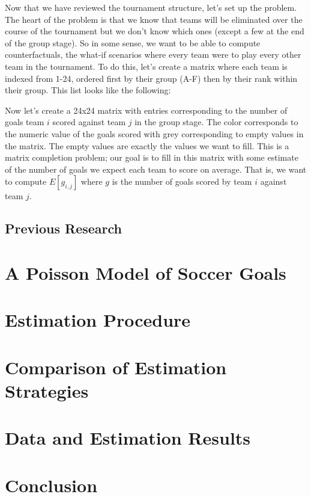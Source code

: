 \documentclass{article}
\begin{document}
Now that we have reviewed the tournament structure, let's set up the problem. The heart of the problem is that we know that teams will be eliminated over the course of the tournament but we don't know which ones (except a few at the end of the group stage). So in some sense, we want to be able to compute counterfactuals, the what-if scenarios where every team were to play every other team in the tournament. To do this, let's create a matrix where each team is indexed from 1-24, ordered first by their group (A-F) then by their rank within their group. This list looks like the following:

Now let's create a 24x24 matrix with entries corresponding to the number of goals team $i$ scored against team $j$ in the group stage. The color corresponds to the numeric value of the goals scored with grey corresponding to empty values in the matrix. The empty values are exactly the values we want to fill. This is a matrix completion problem; our goal is to fill in this matrix with some estimate of the number of goals we expect each team to score on average. That is, we want to compute $E[g_{i,j}]$ where $g$ is the number of goals scored by team $i$ against team $j$.

\subsection{Previous Research}

\section{A Poisson Model of Soccer Goals}

\section{Estimation Procedure}

\section{Comparison of Estimation Strategies}

\section{Data and Estimation Results}

\section{Conclusion}
\end{document}
